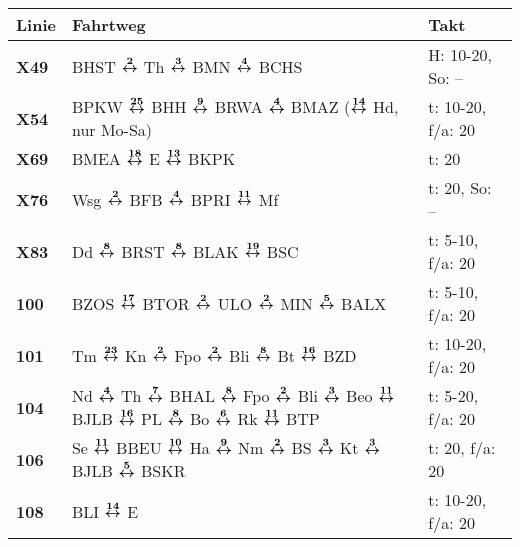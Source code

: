 \begin{minipage}[t]{0.45\textwidth}
\begin{tabular}{>{\bfseries}L{1.2cm}L{9.0cm}L{3.0cm}}
{\bfseries Linie} & {\bfseries Fahrtweg} & {\bfseries Takt} \\
\hline
\xbus{} X49   & BHST $\xarwe{2}$ Th $\xarwe{3}$ BMN $\xarwe{4}$ BCHS                                                                                                                & H: 10-20, So: --           \\
\xbus{} X54   & BPKW $\xarwe{25}$ BHH $\xarwe{9}$ BRWA $\xarwe{4}$ BMAZ ($\xarwe{14}$ Hd, nur Mo-Sa)                                                                                & t: 10-20, f/a: 20          \\
\xbus{} X69   & BMEA $\xarwe{18}$ E $\xarwe{13}$ BKPK                                                                                                                               & t: 20                      \\
\xbus{} X76   & Wsg $\xarwe{2}$ BFB $\xarwe{4}$ BPRI $\xarwe{11}$ Mf                                                                                                                & t: 20, So: --              \\
\xbus{} X83   & Dd $\xarwe{8}$ BRST $\xarwe{8}$ BLAK $\xarwe{19}$ BSC                                                                                                               & t: 5-10, f/a: 20           \\
\bus{} 100    & BZOS $\xarwe{17}$ BTOR $\xarwe{2}$ ULO $\xarwe{2}$ MIN $\xarwe{5}$ BALX                                                                                             & t: 5-10, f/a: 20           \\
\bus{} 101    & Tm $\xarwe{23}$ Kn $\xarwe{2}$ Fpo $\xarwe{2}$ Bli $\xarwe{8}$ Bt $\xarwe{16}$ BZD                                                                                  & t: 10-20, f/a: 20          \\
\bus{} 104    & Nd $\xarwe{4}$ Th $\xarwe{7}$ BHAL $\xarwe{8}$ Fpo $\xarwe{2}$ Bli $\xarwe{3}$ Beo $\xarwe{11}$ BJLB $\xarwe{16}$ PL $\xarwe{8}$ Bo $\xarwe{6}$ Rk $\xarwe{11}$ BTP & t: 5-20, f/a: 20           \\
\bus{} 106    & Se $\xarwe{11}$ BBEU $\xarwe{10}$ Ha $\xarwe{9}$ Nm $\xarwe{2}$ BS $\xarwe{3}$ Kt $\xarwe{3}$ BJLB $\xarwe{5}$ BSKR                                                 & t: 20, f/a: 20             \\
\bus{} 108    & BLI $\xarwe{14}$ E                                                                                                                                                  & t: 10-20, f/a: 20          \\

\end{tabular}
\end{minipage}
